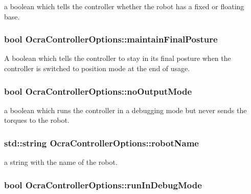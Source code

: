 a boolean which tells the controller whether the robot has a fixed or floating base. \hypertarget{classOcraControllerOptions_ae7b16a5b8264abd18ee8761eb1091ccf}{
\subsubsection[{maintain\-Final\-Posture}]{\setlength{\rightskip}{0pt plus 5cm}bool {\bf \-Ocra\-Controller\-Options\-::maintain\-Final\-Posture}}}\label{classOcraControllerOptions_ae7b16a5b8264abd18ee8761eb1091ccf}
\-A boolean which tells the controller to stay in its final posture when the controller is switched to position mode at the end of usage. \hypertarget{classOcraControllerOptions_af05db2783f36f469fa535fd4ba5c12b1}{
\subsubsection[{no\-Output\-Mode}]{\setlength{\rightskip}{0pt plus 5cm}bool {\bf \-Ocra\-Controller\-Options\-::no\-Output\-Mode}}}\label{classOcraControllerOptions_af05db2783f36f469fa535fd4ba5c12b1}
a boolean which runs the controller in a debugging mode but never sends the torques to the robot. \hypertarget{classOcraControllerOptions_a897948011f23b08ba20e1707033458d4}{
\subsubsection[{robot\-Name}]{\setlength{\rightskip}{0pt plus 5cm}std\-::string {\bf \-Ocra\-Controller\-Options\-::robot\-Name}}}\label{classOcraControllerOptions_a897948011f23b08ba20e1707033458d4}
a string with the name of the robot. \hypertarget{classOcraControllerOptions_a26dce90c0e6cf7ba608020d01cd08f3c}{
\subsubsection[{run\-In\-Debug\-Mode}]{\setlength{\rightskip}{0pt plus 5cm}bool {\bf \-Ocra\-Controller\-Options\-::run\-In\-Debug\-Mode}}}\label{classOcraControllerOptions_a26dce90c0e6cf7ba608020d01cd08f3c}
